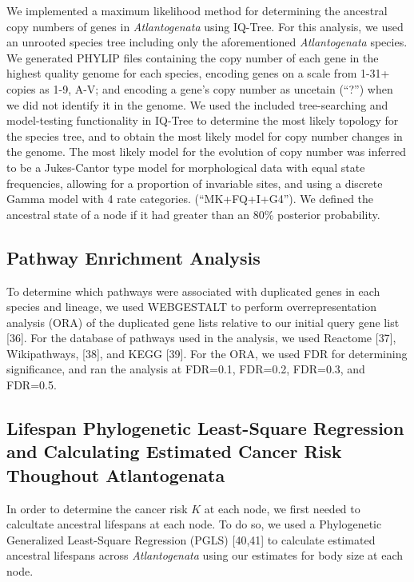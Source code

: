 \documentclass[]{elsarticle} %
\begin{document}
We implemented a maximum likelihood method for determining the ancestral
copy numbers of genes in \emph{Atlantogenata} using IQ-Tree. For this
analysis, we used an unrooted species tree including only the
aforementioned \emph{Atlantogenata} species. We generated PHYLIP files
containing the copy number of each gene in the highest quality genome
for each species, encoding genes on a scale from 1-31+ copies as 1-9,
A-V; and encoding a gene's copy number as uncetain (``?'') when we did
not identify it in the genome. We used the included tree-searching and
model-testing functionality in IQ-Tree to determine the most likely
topology for the species tree, and to obtain the most likely model for
copy number changes in the genome. The most likely model for the
evolution of copy number was inferred to be a Jukes-Cantor type model
for morphological data with equal state frequencies, allowing for a
proportion of invariable sites, and using a discrete Gamma model with 4
rate categories. (``MK+FQ+I+G4''). We defined the ancestral state of a
node if it had greater than an 80\% posterior probability.

\hypertarget{pathway-enrichment-analysis}{%
\subsection{Pathway Enrichment
Analysis}\label{pathway-enrichment-analysis}}

To determine which pathways were associated with duplicated genes in
each species and lineage, we used WEBGESTALT to perform
overrepresentation analysis (ORA) of the duplicated gene lists relative
to our initial query gene list {[}36{]}. For the database of pathways
used in the analysis, we used Reactome {[}37{]}, Wikipathways, {[}38{]},
and KEGG {[}39{]}. For the ORA, we used FDR for determining
significance, and ran the analysis at FDR=0.1, FDR=0.2, FDR=0.3, and
FDR=0.5.

\hypertarget{lifespan-phylogenetic-least-square-regression-and-calculating-estimated-cancer-risk-thoughout-atlantogenata}{%
\subsection{Lifespan Phylogenetic Least-Square Regression and
Calculating Estimated Cancer Risk Thoughout
Atlantogenata}\label{lifespan-phylogenetic-least-square-regression-and-calculating-estimated-cancer-risk-thoughout-atlantogenata}}

In order to determine the cancer risk \(K\) at each node, we first
needed to calcultate ancestral lifespans at each node. To do so, we used
a Phylogenetic Generalized Least-Square Regression (PGLS) {[}40,41{]} to
calculate estimated ancestral lifespans across \emph{Atlantogenata}
using our estimates for body size at each node.
\end{document}
